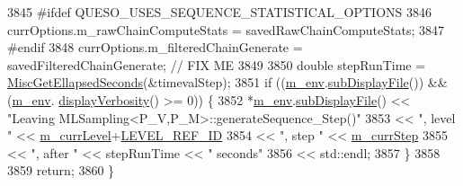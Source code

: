 \begin{DoxyCode}
3845 \textcolor{preprocessor}{#ifdef QUESO\_USES\_SEQUENCE\_STATISTICAL\_OPTIONS}
3846 \textcolor{preprocessor}{}      currOptions.m\_rawChainComputeStats  = savedRawChainComputeStats;
3847 \textcolor{preprocessor}{#endif}
3848 \textcolor{preprocessor}{}      currOptions.m\_filteredChainGenerate = savedFilteredChainGenerate; \textcolor{comment}{// FIX ME}
3849 
3850   \textcolor{keywordtype}{double} stepRunTime = \hyperlink{namespace_q_u_e_s_o_a424bc33f2e6e287fd468408d14b772ee}{MiscGetEllapsedSeconds}(&timevalStep);
3851   \textcolor{keywordflow}{if} ((\hyperlink{class_q_u_e_s_o_1_1_m_l_sampling_a13f1ca4fe9f94822fe572a743eaced1d}{m\_env}.\hyperlink{class_q_u_e_s_o_1_1_base_environment_a8a0064746ae8dddfece4229b9ad374d6}{subDisplayFile}()) && (\hyperlink{class_q_u_e_s_o_1_1_m_l_sampling_a13f1ca4fe9f94822fe572a743eaced1d}{m\_env}.
      \hyperlink{class_q_u_e_s_o_1_1_base_environment_a1fe5f244fc0316a0ab3e37463f108b96}{displayVerbosity}() >= 0)) \{
3852     *\hyperlink{class_q_u_e_s_o_1_1_m_l_sampling_a13f1ca4fe9f94822fe572a743eaced1d}{m\_env}.\hyperlink{class_q_u_e_s_o_1_1_base_environment_a8a0064746ae8dddfece4229b9ad374d6}{subDisplayFile}() << \textcolor{stringliteral}{"Leaving MLSampling<P\_V,P\_M>::generateSequence\_Step()"}
3853                             << \textcolor{stringliteral}{", level "} << \hyperlink{class_q_u_e_s_o_1_1_m_l_sampling_af9416874c856e50f3b35270e801f17e4}{m\_currLevel}+\hyperlink{_m_l_sampling_level_options_8h_a68d15eaf394d210effcf584b938206d3}{LEVEL\_REF\_ID}
3854                             << \textcolor{stringliteral}{", step "}  << \hyperlink{class_q_u_e_s_o_1_1_m_l_sampling_a1b1f8ccb4823bdfa26ec652f0807c63e}{m\_currStep}
3855                             << \textcolor{stringliteral}{", after "} << stepRunTime << \textcolor{stringliteral}{" seconds"}
3856                             << std::endl;
3857   \}
3858 
3859   \textcolor{keywordflow}{return};
3860 \}
\end{DoxyCode}
